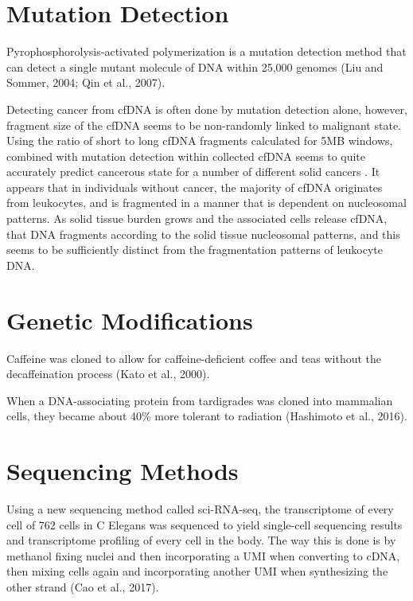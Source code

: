 \documentclass[]{book}
\begin{document}
\hypertarget{mutation-detection}{%
\section{Mutation Detection}\label{mutation-detection}}

Pyrophosphorolysis-activated polymerization is a mutation detection method that can detect a single mutant molecule of DNA within 25,000 genomes (Liu and Sommer, 2004; Qin et al., 2007).

Detecting cancer from cfDNA is often done by mutation detection alone, however, fragment size of the cfDNA seems to be non-randomly linked to malignant state. Using the ratio of short to long cfDNA fragments calculated for 5MB windows, combined with mutation detection within collected cfDNA seems to quite accurately predict cancerous state for a number of different solid cancers \citep{cristiano2019genome}. It appears that in individuals without cancer, the majority of cfDNA originates from
leukocytes, and is fragmented in a manner that is dependent on nucleosomal patterns. As solid tissue burden grows and the associated cells release cfDNA, that DNA fragments according to the solid tissue nucleosomal patterns, and this seems to be sufficiently distinct from the fragmentation patterns of leukocyte DNA.

\hypertarget{genetic-modifications}{%
\section{Genetic Modifications}\label{genetic-modifications}}

Caffeine was cloned to allow for caffeine-deficient coffee and teas without the decaffeination process (Kato et al., 2000).

When a DNA-associating protein from tardigrades was cloned into mammalian cells, they became about 40\% more tolerant to radiation (Hashimoto et al., 2016).

\hypertarget{sequencing-methods}{%
\section{Sequencing Methods}\label{sequencing-methods}}

Using a new sequencing method called sci-RNA-seq, the transcriptome of every cell of 762 cells in C Elegans was sequenced to yield single-cell sequencing results and transcriptome profiling of every cell in the body. The way this is done is by methanol fixing nuclei and then incorporating a UMI when converting to cDNA, then mixing cells again and incorporating another UMI when synthesizing the other strand (Cao et al., 2017).
\end{document}
